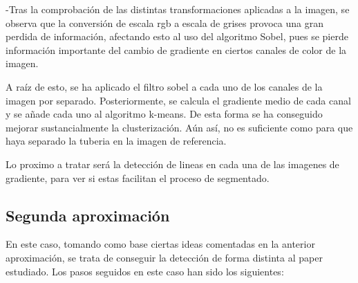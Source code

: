\documentclass[12pt, a4paper]{article}
\begin{document}
-Tras la comprobación de las distintas transformaciones aplicadas a la imagen, se observa que la conversión de escala rgb a escala 
de grises provoca una gran perdida de información, afectando esto al uso del algoritmo Sobel, pues se pierde información importante del cambio de 
gradiente en ciertos canales de color de la imagen.

A raíz de esto, se ha aplicado el filtro sobel a cada uno de los canales de la imagen por separado. Posteriormente, se calcula el gradiente medio de cada
canal y se añade cada uno al algoritmo k-means. De esta forma se ha conseguido mejorar sustancialmente la clusterización. Aún así, no es suficiente como para que 
haya separado la tuberia en la imagen de referencia. 

Lo proximo a tratar será la detección de lineas en cada una de las imagenes de gradiente, para ver si estas facilitan el proceso de segmentado.

\subsection{Segunda aproximación}

En este caso, tomando como base ciertas ideas comentadas en la anterior aproximación, 
se trata de conseguir la detección de forma distinta al paper estudiado. Los pasos seguidos 
en este caso han sido los siguientes: 
\end{document}
